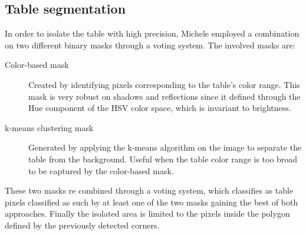 \subsection{Table segmentation}

In order to isolate the table with high precision, Michele employed a combination on two different binary masks through a voting system.
The involved masks are:
\begin{description}
	\item[Color-based mask] Created by identifying pixels corresponding to the table's color range. This mask is very robust on shadows and reflections since it defined through the Hue component of the HSV color space, which is invariant to brightness.
	\item[k-means clustering mask] Generated by applying the k-means algorithm on the image to separate the table from the background. Useful when the table color range is too broad to be captured by the color-based mask.
\end{description}
These two masks re combined through a voting system, which classifies as table pixels classified as such by at least one of the two masks gaining the best of both approaches.
Finally the isolated area is limited to the pixels inside the polygon defined by the previously detected corners.
